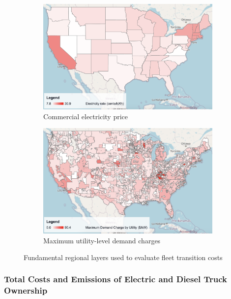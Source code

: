 \begin{figure}[ht]
    \centering
    \begin{subfigure}[b]{0.49\textwidth}
        \centering
        \includegraphics[width=\textwidth]{figures/commercial_electricity_price.png}
        \caption{Commercial electricity price}
        \label{fig:commercial_electricity_price}
    \end{subfigure}
    \hfill
    \begin{subfigure}[b]{0.49\textwidth}
        \centering
        \includegraphics[width=\textwidth]{figures/demand_charge.png}
        \caption{Maximum utility-level demand charges}
        \label{fig:demand_charge}
    \end{subfigure}
    \caption{Fundamental regional layers used to evaluate fleet transition costs}
    \label{fig:grid_costs}
\end{figure}

\subsubsection{Total Costs and Emissions of Electric and Diesel Truck Ownership}

